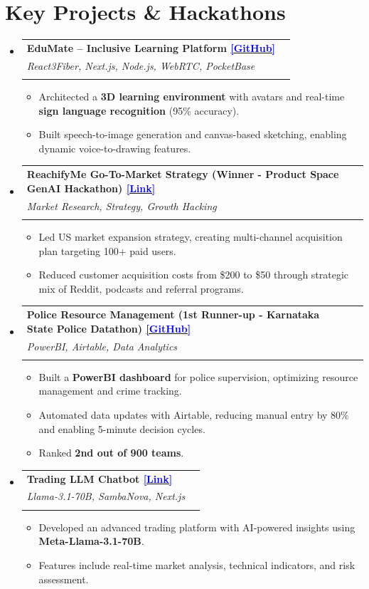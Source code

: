 \documentclass[A4paper,5pt]{article}
\makeatletter
\renewcommand{\resumeItem}[1]{%
  \item\small{#1 \vspace{-2pt}}%
}
\newcommand{\resumeSubheading}[4]{%
  \vspace{-1pt}\item
    \begin{tabular*}{0.97\textwidth}{l@{\extracolsep{\fill}}r}
      \textbf{#1} & #2 \\
      \if\relax\detokenize{#3}\relax
      \else
        \textit{#3} & \textit{#4} \\
      \fi
    \end{tabular*}\vspace{-5pt}
}
\newcommand{\resumeSubHeadingListStart}{\begin{itemize}[leftmargin=*]}
\newcommand{\resumeSubHeadingListEnd}{\end{itemize}}
\newcommand{\resumeItemListStart}{\begin{itemize}}
\newcommand{\resumeItemListEnd}{\end{itemize}\vspace{-5pt}}
\newcommand{\linkblue}[2]{\href{#1}{\textcolor{blue}{#2}}}
\makeatother
\begin{document}
\section{Key Projects \& Hackathons}
  \resumeSubHeadingListStart
    \resumeSubheading
      {EduMate – Inclusive Learning Platform \linkblue{https://github.com/Aakashdeep-Srivastava/edumate1.1}{[GitHub]}}{}
      {React3Fiber, Next.js, Node.js, WebRTC, PocketBase}{}
      \resumeItemListStart
        \resumeItem{Architected a \textbf{3D learning environment} with avatars and real-time \textbf{sign language recognition} (95\% accuracy).}
        \resumeItem{Built speech-to-image generation and canvas-based sketching, enabling dynamic voice-to-drawing features.}
      \resumeItemListEnd

    \resumeSubheading
      {ReachifyMe Go-To-Market Strategy (Winner - Product Space GenAI Hackathon) \linkblue{https://drive.google.com/file/d/1Sfnlhc80Fi1jH4P0I6wBTrbXdB41NpC8/view}{[Link]}}{}
      {Market Research, Strategy, Growth Hacking}{}
      \resumeItemListStart
        \resumeItem{Led US market expansion strategy, creating multi-channel acquisition plan targeting 100+ paid users.}
        \resumeItem{Reduced customer acquisition costs from \$200 to \$50 through strategic mix of Reddit, podcasts and referral programs.}
      \resumeItemListEnd

    \resumeSubheading
      {Police Resource Management (1st Runner-up - Karnataka State Police Datathon) \linkblue{https://github.com/Aakashdeep-Srivastava/PRM_Karnataka}{[GitHub]}}{}
      {PowerBI, Airtable, Data Analytics}{}
      \resumeItemListStart
        \resumeItem{Built a \textbf{PowerBI dashboard} for police supervision, optimizing resource management and crime tracking.}
        \resumeItem{Automated data updates with Airtable, reducing manual entry by 80\% and enabling 5-minute decision cycles.}
        \resumeItem{Ranked \textbf{2nd out of 900 teams}.}
      \resumeItemListEnd

    \resumeSubheading
      {Trading LLM Chatbot \linkblue{https://devpost.com/software/financial-risk-copilot}{[Link]}}{}
      {Llama-3.1-70B, SambaNova, Next.js}{}
      \resumeItemListStart
        \resumeItem{Developed an advanced trading platform with AI-powered insights using \textbf{Meta-Llama-3.1-70B}.}
        \resumeItem{Features include real-time market analysis, technical indicators, and risk assessment.}
      \resumeItemListEnd

  \resumeSubHeadingListEnd
\vspace{-5pt}
\end{document}
